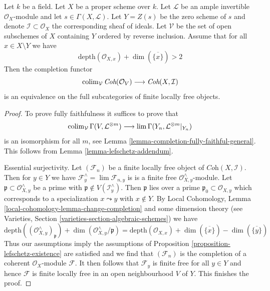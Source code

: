 \begin{proposition}
\label{proposition-lefschetz-equivalence}
Let $k$ be a field. Let $X$ be a proper scheme over $k$.
Let $\mathcal{L}$ be an ample invertible $\mathcal{O}_X$-module
and let $s \in \Gamma(X, \mathcal{L})$. Let $Y = Z(s)$
be the zero scheme of $s$ and denote $\mathcal{I} \subset \mathcal{O}_X$
the corresponding sheaf of ideals.
Let $\mathcal{V}$ be the set of open subschemes of $X$ containing $Y$
ordered by reverse inclusion.
Assume that for all $x \in X \setminus Y$ we have
$$
\text{depth}(\mathcal{O}_{X, x}) + \dim(\overline{\{x\}}) > 2
$$
Then the completion functor
$$
\mathop{\mathrm{colim}}\nolimits_\mathcal{V}
\textit{Coh}(\mathcal{O}_V)
\longrightarrow
\textit{Coh}(X, \mathcal{I})
$$
is an equivalence on the full subcategories of finite locally free objects.
\end{proposition}

\begin{proof}
To prove fully faithfulness it suffices to prove that
$$
\mathop{\mathrm{colim}}\nolimits_\mathcal{V} \Gamma(V, \mathcal{L}^{\otimes m})
\longrightarrow
\mathop{\mathrm{lim}}\nolimits \Gamma(Y_n, \mathcal{L}^{\otimes m}|_{Y_n})
$$
is an isomorphism for all $m$, see
Lemma \ref{lemma-completion-fully-faithful-general}.
This follows from Lemma \ref{lemma-lefschetz-addendum}.

\medskip\noindent
Essential surjectivity. Let $(\mathcal{F}_n)$ be a finite locally
free object of $\textit{Coh}(X, \mathcal{I})$. Then for $y \in Y$ we have
$\mathcal{F}_y^\wedge = \lim \mathcal{F}_{n, y}$ is
is a finite free $\mathcal{O}_{X, y}^\wedge$-module.
Let $\mathfrak p \subset \mathcal{O}_{X, y}^\wedge$
be a prime with $\mathfrak p \not \in V(\mathcal{I}_y^\wedge)$.
Then $\mathfrak p$ lies over a prime $\mathfrak p_0 \subset \mathcal{O}_{X, y}$
which corresponds to a specialization $x \leadsto y$ with
$x \not \in Y$. By Local Cohomology, Lemma
\ref{local-cohomology-lemma-change-completion}
and some dimension theory
(see Varieties, Section \ref{varieties-section-algebraic-schemes})
we have
$$
\text{depth}((\mathcal{O}_{X, y}^\wedge)_\mathfrak p) +
\dim(\mathcal{O}_{X, y}^\wedge/\mathfrak p) =
\text{depth}(\mathcal{O}_{X, x}) +
\dim(\overline{\{x\}}) - \dim(\overline{\{y\}})
$$
Thus our assumptions imply the assumptions of
Proposition \ref{proposition-lefschetz-existence}
are satisfied and we find that $(\mathcal{F}_n)$
is the completion of a coherent $\mathcal{O}_X$-module $\mathcal{F}$.
It then follows that $\mathcal{F}_y$ is finite free for all $y \in Y$
and hence $\mathcal{F}$ is finite locally free in an open
neighbourhood $V$ of $Y$. This finishes the proof.
\end{proof}















